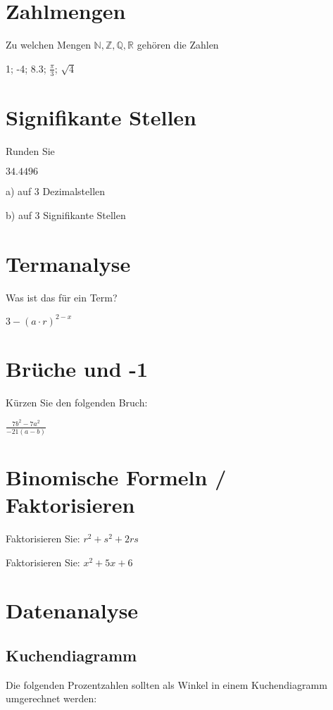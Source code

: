 



\usepackage{amssymb} %
\renewcommand{\metaHeaderLine}{Rückblick}
\renewcommand{\arbeitsblattTitel}{1. Jahr GESO}

\arbeitsblattHeader{}

\section{Zahlmengen}
Zu welchen Mengen $\mathbb{N}, \mathbb{Z}, \mathbb{Q}, \mathbb{R}$ gehören die Zahlen

1; -4; 8.3; $\frac{\pi}{3}$; $\sqrt{4}$

\section{Signifikante Stellen}
Runden Sie

$34.4496$

a) auf 3 Dezimalstellen 

b) auf 3 Signifikante Stellen 


\section{Termanalyse}
Was ist das für ein Term?

$3 - (a\cdot{}r)^{2-x}$ 

\section{Brüche und -1}
Kürzen Sie den folgenden Bruch:

$\frac{7b^2 - 7a^2}{-21(a-b)}$

\section{Binomische Formeln / Faktorisieren}
Faktorisieren Sie:
$r^2 + s^2 + 2rs$    

Faktorisieren Sie:
$x^2 + 5x + 6$ 

\section{Datenanalyse}
\subsection{Kuchendiagramm}
Die folgenden Prozentzahlen sollten als Winkel in einem Kuchendiagramm umgerechnet werden:

